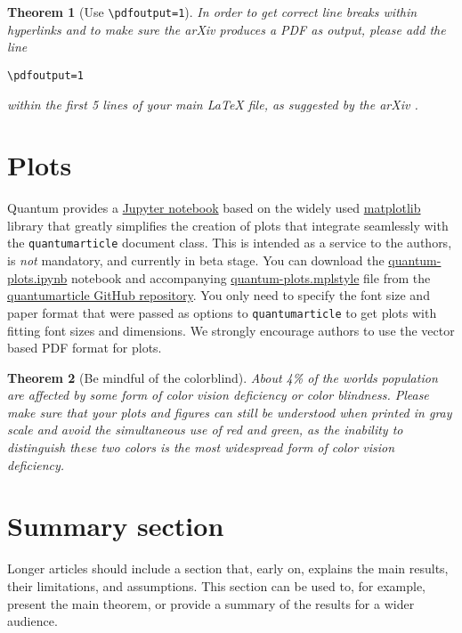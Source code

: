 \documentclass[a4paper,twocolumn,11pt,accepted=2017-05-09]{quantumarticle}
\newtheorem{theorem}{Theorem}
\begin{document}
\begin{theorem}[Use \texttt{\textbackslash pdfoutput=1}]
  In order to get correct line breaks within hyperlinks and to make sure the arXiv produces a PDF as output, please add the line
\begin{verbatim}
\pdfoutput=1
\end{verbatim}
  within the first 5 lines of your main LaTeX file, as suggested by the arXiv \cite{arxivpdfoutput}.
\end{theorem}

\section{Plots}
\label{sec:plots}
Quantum provides a \href{https://jupyter.org/}{Jupyter notebook} based on the widely used \href{https://matplotlib.org/}{matplotlib} library that greatly simplifies the creation of plots that integrate seamlessly with the \texttt{quantumarticle} document class. This is intended as a service to the authors, is \textit{not} mandatory, and currently in beta stage. You can download the \href{https://raw.githubusercontent.com/quantum-journal/quantum-journal/master/quantum-plots.ipynb}{quantum-plots.ipynb} notebook and accompanying \href{https://raw.githubusercontent.com/quantum-journal/quantum-journal/master/quantum-plots.mplstyle}{quantum-plots.mplstyle} file from the \href{https://github.com/quantum-journal/quantum-journal}{quantumarticle GitHub repository}. You only need to specify the font size and paper format that were passed as options to \texttt{quantumarticle} to get plots with fitting font sizes and dimensions.
We strongly encourage authors to use the vector based PDF format for plots.

\begin{theorem}[Be mindful of the colorblind]
  About 4\% of the worlds population are affected by some form of color vision deficiency or color blindness.
  Please make sure that your plots and figures can still be understood when printed in gray scale and avoid the simultaneous use of red and green, as the inability to distinguish these two colors is the most widespread form of color vision deficiency.
\end{theorem}

\section{Summary section}
Longer articles should include a section that, early on, explains the main results, their limitations, and assumptions.
This section can be used to, for example, present the main theorem, or provide a summary of the results for a wider audience.
\end{document}
